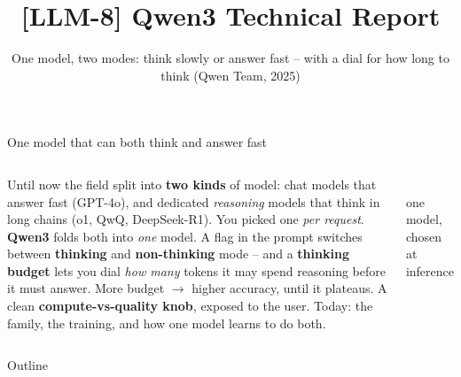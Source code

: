 \documentclass[aspectratio=169]{beamer}
\title{[LLM-8] Qwen3 Technical Report}
\subtitle{One model, two modes: think slowly or answer fast -- with a dial for how
  long to think (Qwen Team, 2025)}
\date{}
\begin{document}
\begin{frame}{One model that can both think and answer fast}
  \begin{columns}[T]
    Until now the field split into \textbf{two kinds} of model: chat models that answer
    fast (GPT-4o), and dedicated \emph{reasoning} models that think in long chains (o1, QwQ,
    DeepSeek-R1). You picked one \emph{per request}.
    \vskip 6pt
    \textbf{Qwen3} folds both into \emph{one} model. A flag in the prompt switches between
    \textbf{thinking} and \textbf{non-thinking} mode -- and a \textbf{thinking budget} lets
    you dial \emph{how many} tokens it may spend reasoning before it must answer.
    \vskip 4pt
    More budget $\rightarrow$ higher accuracy, until it plateaus. A clean
    \textbf{compute-vs-quality knob}, exposed to the user.
    \vskip 3pt
    Today: the family, the training, and how one model learns to do both.
    \begin{center}
      \\[2pt]
      {\scriptsize one model, chosen at inference}
    \end{center}
  \end{columns}
\end{frame}

\begin{frame}{Outline}
  \tableofcontents
\end{frame}

\end{document}
